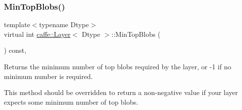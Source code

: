 \subsubsection{\texorpdfstring{Min\+Top\+Blobs()}{MinTopBlobs()}\hspace{0.1cm}{\footnotesize\ttfamily [1/2]}}
{\footnotesize\ttfamily template$<$typename Dtype$>$ \\
virtual int \mbox{\hyperlink{classcaffe_1_1_layer}{caffe\+::\+Layer}}$<$ Dtype $>$\+::Min\+Top\+Blobs (\begin{DoxyParamCaption}{ }\end{DoxyParamCaption}) const\hspace{0.3cm}{\ttfamily [inline]}, {\ttfamily [virtual]}}



Returns the minimum number of top blobs required by the layer, or -\/1 if no minimum number is required. 

This method should be overridden to return a non-\/negative value if your layer expects some minimum number of top blobs. 

